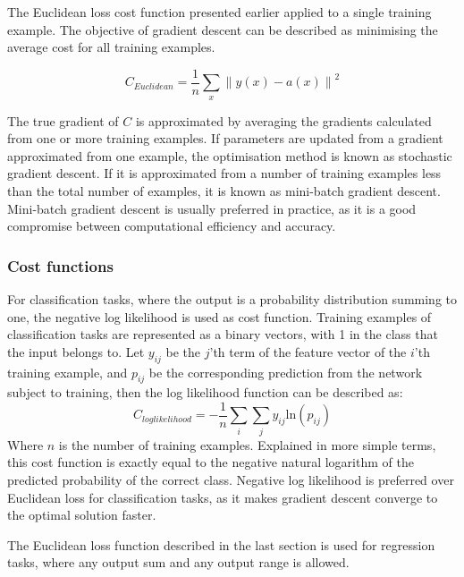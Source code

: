 The Euclidean loss cost function presented earlier applied to a single training example. The objective of gradient descent can be described as minimising the average cost for all training examples.

$$C_{Euclidean} = \frac{1}{n} \sum_{x} {\lVert y(x) - a(x) \rVert}^2$$

The true gradient of $C$ is approximated by averaging the gradients calculated from one or more training examples. If parameters are updated from a gradient approximated from one example, the optimisation method is known as stochastic gradient descent. If it is approximated from a number of training examples less than the total number of examples, it is known as mini-batch gradient descent. Mini-batch gradient descent is usually preferred in practice, as it is a good compromise between computational efficiency and accuracy.

\subsubsection{Cost functions}
\label{sec:negative}
For classification tasks, where the output is a probability distribution summing to one, the negative log likelihood is used as cost function. Training examples of classification tasks are represented as a binary vectors, with 1 in the class that the input belongs to. Let $y_{ij}$ be the $j$'th term of the feature vector of the $i$'th training example, and $p_{ij}$ be the corresponding prediction from the network subject to training, then the log likelihood function can be described as:
$$ C_{loglikelihood} = -\frac{1}{n} \sum_{i} \sum_{j} y_{ij}\text{ln}(p_{ij}) $$
Where $n$ is the number of training examples. Explained in more simple terms, this cost function is exactly equal to the negative natural logarithm of the predicted probability of the correct class. Negative log likelihood is preferred over Euclidean loss for classification tasks, as it makes gradient descent converge to the optimal solution faster\cite{Solla}.

The Euclidean loss function described in the last section is used for regression tasks, where any output sum and any output range is allowed.



